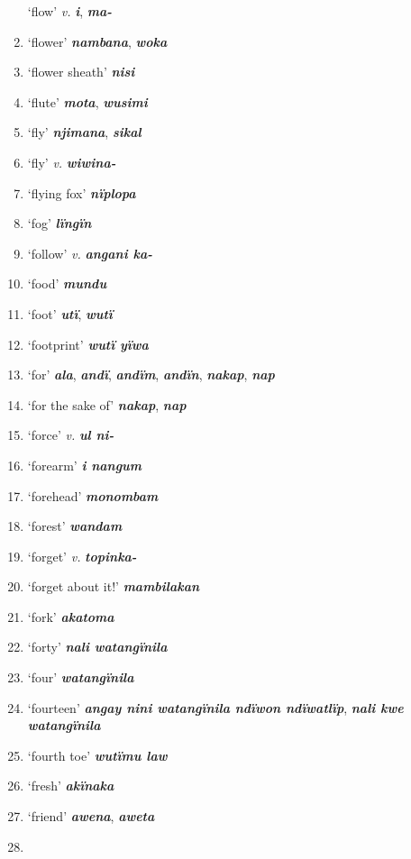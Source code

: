 \begin{enumerate}[noitemsep, label={}, align=left, widest=190, labelsep=1ex,leftmargin=*,itemindent=-10pt]
‘flow’ \textit{v.} \textbf{\textit{i}}, \textbf{\textit{ma-}} \item
‘flower’ \textbf{\textit{nambana}}, \textbf{\textit{woka}} \item
‘flower sheath’ \textbf{\textit{nisi}} \item
‘flute’ \textbf{\textit{mota}}, \textbf{\textit{wusimi}} \item
‘fly’ \textbf{\textit{njimana}}, \textbf{\textit{sikal}} \item
‘fly’ \textit{v.} \textbf{\textit{wiwina-}} \item
‘flying fox’ \textbf{\textit{nïplopa}} \item
‘fog’ \textbf{\textit{lïngïn}} \item
‘follow’ \textit{v.} \textbf{\textit{angani ka-}} \item
‘food’ \textbf{\textit{mundu}} \item
‘foot’ \textbf{\textit{utï}}, \textbf{\textit{wutï}} \item
‘footprint’ \textbf{\textit{wutï yïwa}} \item
‘for’ \textbf{\textit{ala}}, \textbf{\textit{andï}}, \textbf{\textit{andïm}}, \textbf{\textit{andïn}}, \textbf{\textit{nakap}}, \textbf{\textit{nap}} \item
‘for the sake of’ \textbf{\textit{nakap}}, \textbf{\textit{nap}} \item
‘force’ \textit{v.} \textbf{\textit{ul ni-}} \item
‘forearm’ \textbf{\textit{i nangum}} \item
‘forehead’ \textbf{\textit{monombam}} \item
‘forest’ \textbf{\textit{wandam}} \item
‘forget’ \textit{v.} \textbf{\textit{topinka-}} \item
‘forget about it!’ \textbf{\textit{mambilakan}} \item
‘fork’ \textbf{\textit{akatoma}} \item
‘forty’ \textbf{\textit{nali watangïnila}} \item
‘four’ \textbf{\textit{watangïnila}} \item
‘fourteen’ \textbf{\textit{angay nini watangïnila ndïwon ndïwatlïp}}, \textbf{\textit{nali kwe watangïnila}} \item
‘fourth toe’ \textbf{\textit{wutïmu law}} \item
‘fresh’ \textbf{\textit{akïnaka}} \item
‘friend’ \textbf{\textit{awena}}, \textbf{\textit{aweta}} \item

\end{enumerate}
